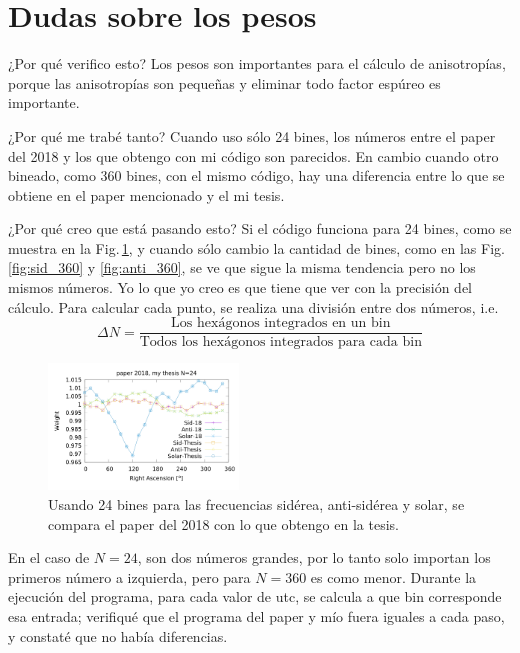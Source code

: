 
\section{Dudas sobre los pesos}

¿Por qué verifico esto? Los pesos son importantes para el cálculo de anisotropías, porque las anisotropías son pequeñas y eliminar todo factor espúreo es importante.

¿Por qué me trabé tanto? Cuando uso sólo 24 bines, los números entre el paper del 2018 y los que obtengo con mi código son parecidos. En cambio cuando otro bineado, como 360 bines, con el mismo código, hay una diferencia entre lo que se obtiene en el paper mencionado y el mi tesis.

¿Por qué creo que está pasando esto? Si el código funciona para 24 bines, como se muestra en la Fig.\,\ref{fig:all_24}, y cuando sólo cambio la cantidad de bines, como en las Fig.\,\ref{fig:sid_360} y \ref{fig:anti_360}, se ve que sigue la misma tendencia pero no los mismos números. Yo lo que yo creo es que tiene que ver con la precisión del cálculo. Para calcular cada punto, se realiza una división entre dos números, i.e. 
\begin{equation}
	\Delta N = \frac{\text{Los hexágonos integrados en un bin}}{\text{Todos los hexágonos integrados para cada bin}}
\end{equation}


\begin{figure}[H]
	\centering
	\includegraphics[width=0.45\textwidth]{solar_anti_sid_my_and_paper_in_24.png}
	\caption{Usando 24 bines para las frecuencias sidérea, anti-sidérea y solar, se compara el paper del 2018 con lo que obtengo en la tesis.}
	\label{fig:all_24}
\end{figure}


En el caso de $N=24$, son dos números grandes, por lo tanto solo importan los primeros número a izquierda, pero para  $N=360$ es como menor. Durante la ejecución del programa, para cada valor de utc, se calcula a que bin corresponde esa entrada; verifiqué que el programa del paper y mío fuera iguales a cada paso, y constaté que no había diferencias.

